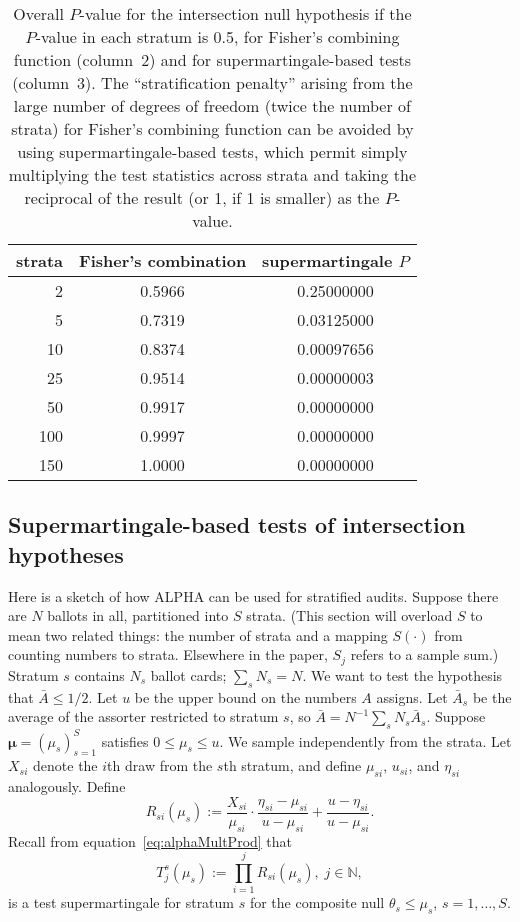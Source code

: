 \documentclass[aoas]{imsart}
\begin{document}
\begin{table} 
\centering
\begin{tabular}{r|cc} 
 strata & Fisher's combination & supermartingale $P$ \\
 \hline
2 & 0.5966 & 0.25000000 \\
5 & 0.7319 & 0.03125000 \\
10 & 0.8374 & 0.00097656 \\
25 & 0.9514 & 0.00000003 \\
50 & 0.9917 & 0.00000000 \\
100 & 0.9997 & 0.00000000 \\
150 & 1.0000 & 0.00000000 
\end{tabular} 
 \caption{\protect \label{tab:fisher} Overall $P$-value for the intersection null hypothesis if the $P$-value in each stratum is 0.5, for Fisher's combining function (column~2) and for supermartingale-based tests (column~3). 
 The ``stratification penalty'' arising from the large number of degrees of freedom (twice the number of strata) for Fisher's combining function can be avoided by using supermartingale-based tests, which permit simply multiplying the test statistics across strata and taking
 the reciprocal of the result  (or 1, if 1 is smaller) as the $P$-value.}
 \end{table}

\subsection{Supermartingale-based tests of intersection hypotheses} \label{sec:supermartingale-intersection}
Here is a sketch of how ALPHA can be used for stratified audits.
Suppose there are $N$ ballots in all, partitioned into $S$ strata.
(This section will overload $S$ to mean two related things: the number of strata and
a mapping $S(\cdot)$ from counting numbers to strata. 
Elsewhere in the paper, $S_j$ refers to a sample sum.)
Stratum $s$ contains $N_s$ ballot cards; $\sum_s N_s = N$.
We want to test the hypothesis that $\bar{A} \le 1/2$.
Let $u$ be the upper bound on the numbers $A$ assigns.
Let $\bar{A}_s$ be the average of the assorter restricted to stratum $s$, so
$\bar{A} = N^{-1}\sum_s N_s \bar{A}_s$.
Suppose $\boldsymbol{\mu} = (\mu_s)_{s=1}^S$ satisfies $0 \le \mu_s \le u$.
We sample independently from the strata.
Let $X_{si}$ denote the $i$th draw from the $s$th stratum, and define $\mu_{si}$, $u_{si}$, and $\eta_{si}$ analogously.
Define
\begin{equation}
   R_{si}(\mu_s) := \frac{X_{si}}{\mu_{si}} \cdot \frac{\eta_{si}-\mu_{si}}{u-\mu_{si}} + \frac{u-\eta_{si}}{u-\mu_{si}}.
 \end{equation}
Recall from equation~\ref{eq:alphaMultProd} that
\begin{equation} 
T_j^s(\mu_s) := \prod_{i=1}^j R_{si}(\mu_s), \; j \in \mathbb{N},
\end{equation}
is a test supermartingale for stratum $s$ for the composite null $\theta_s \le \mu_s$, $s=1, \ldots, S$.
\end{document}

